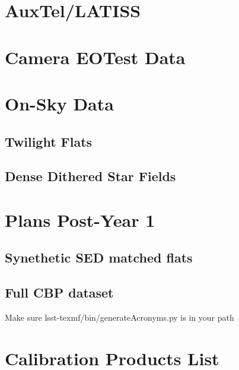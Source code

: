 \documentclass[SE,authoryear,lsstdraft,toc]{lsstdoc}
\begin{document}
\section{AuxTel/LATISS}

\section{Camera EOTest Data}

\section{On-Sky Data}
\subsection{Twilight Flats}
\subsection{Dense Dithered Star Fields}

\section{Plans Post-Year 1}
\subsection{Synethetic SED matched flats}
\subsection{Full CBP dataset}


 Make sure lsst-texmf/bin/generateAcronyms.py is in your path
\appendix
\section{Calibration Products List}
\end{document}
